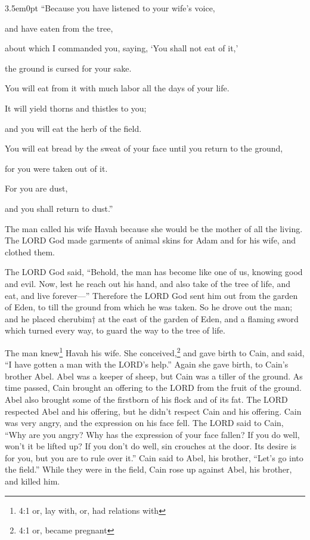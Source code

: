 \begin{adjustwidth}{3.5em}{0pt}
	“Because you have listened to your wife’s voice,
	
	and have eaten from the tree,
	
	about which I commanded you, saying, ‘You shall not eat of it,’
	
	the ground is cursed for your sake.
	
	You will eat from it with much labor all the days of your life.
	
	\myverse{}It will yield thorns and thistles to you;
	
	and you will eat the herb of the field.
	
	\myverse{}You will eat bread by the sweat of your face until you return to the ground,
	
	for you were taken out of it.
	
	For you are dust,
	
	and you shall return to dust.”
\end{adjustwidth}

\myverse{}The man called his wife Havah because she would be the mother of all the living. \myverse{}The LORD God made garments of animal skins for Adam and for his wife, and clothed them.

\myverse{}The LORD God said, “Behold, the man has become like one of us, knowing good and evil. Now, lest he reach out his hand, and also take of the tree of life, and eat, and live forever—” \myverse{}Therefore the LORD God sent him out from the garden of Eden, to till the ground from which he was taken. \myverse{}So he drove out the man; and he placed cherubim† at the east of the garden of Eden, and a flaming sword which turned every way, to guard the way to the tree of life.


\mychapter{}
\myverse*{}The man knew\footnote{4:1 or, lay with, or, had relations with} Havah his wife. She conceived,\footnote{4:1 or, became pregnant} and gave birth to Cain, and said, “I have gotten a man with the LORD’s help.” \myverse{}Again she gave birth, to Cain’s brother Abel. Abel was a keeper of sheep, but Cain was a tiller of the ground.  \myverse{}As time passed, Cain brought an offering to the LORD from the fruit of the ground.  \myverse{}Abel also brought some of the firstborn of his flock and of its fat. The LORD respected Abel and his offering,  \myverse{} but he didn’t respect Cain and his offering. Cain was very angry, and the expression on his face fell.  \myverse{}The LORD said to Cain, “Why are you angry? Why has the expression of your face fallen?  \myverse{}If you do well, won’t it be lifted up? If you don’t do well, sin crouches at the door. Its desire is for you, but you are to rule over it.”  \myverse{}Cain said to Abel, his brother, “Let’s go into the field.” While they were in the field, Cain rose up against Abel, his brother, and killed him.

